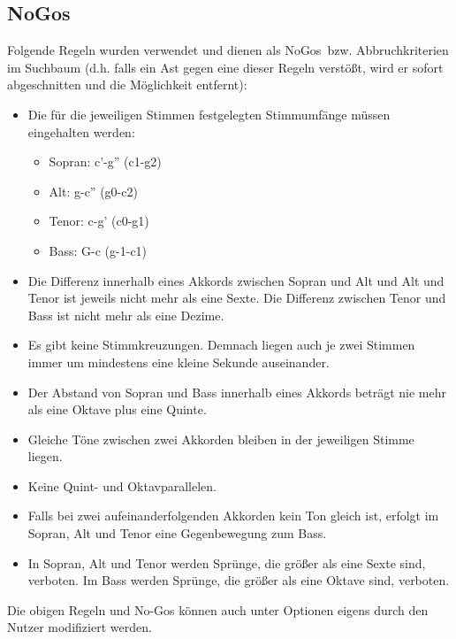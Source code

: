 \documentclass[11.5pt,a4paper]{article}
\begin{document}
\subsection{NoGos}\label{Abbruchkriterien}
Folgende Regeln wurden verwendet und dienen als \glqq NoGos\grqq \ bzw. Abbruchkriterien im Suchbaum (d.h. falls ein Ast gegen eine dieser Regeln verstößt, wird er sofort abgeschnitten und die Möglichkeit entfernt):
\begin{itemize}
	\item Die für die jeweiligen Stimmen festgelegten Stimmumfänge müssen eingehalten werden: 
	\begin{itemize}
		\item Sopran: c'-g'' (c1-g2)
		\item Alt: g-c'' (g0-c2)
		\item Tenor: c-g' (c0-g1)
		\item Bass: G-c (g-1-c1)
	\end{itemize}
	\item Die Differenz innerhalb eines Akkords zwischen Sopran und Alt und Alt und Tenor ist jeweils nicht mehr als eine Sexte. Die Differenz zwischen Tenor und Bass ist nicht mehr als eine Dezime. 
	\item Es gibt keine Stimmkreuzungen. Demnach liegen auch je zwei Stimmen immer um mindestens eine kleine Sekunde auseinander. 
	\item Der Abstand von Sopran und Bass innerhalb eines Akkords beträgt nie mehr als eine Oktave plus eine Quinte.
	\item Gleiche Töne zwischen zwei Akkorden bleiben in der jeweiligen Stimme liegen. 
	\item Keine Quint- und Oktavparallelen.
	\item Falls bei zwei aufeinanderfolgenden Akkorden kein Ton gleich ist, erfolgt im Sopran, Alt und Tenor eine Gegenbewegung zum Bass.
	\item In Sopran, Alt und Tenor werden Sprünge, die größer als eine Sexte sind, verboten. Im Bass werden Sprünge, die größer als eine Oktave sind, verboten.
\end{itemize}
Die obigen Regeln und No-Gos können auch unter \grqq Optionen \glqq eigens durch den Nutzer modifiziert werden.
\end{document}
